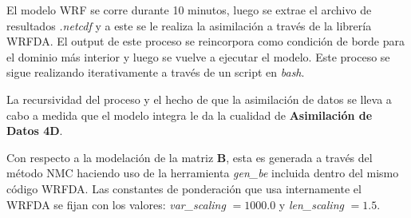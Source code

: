 El modelo WRF se corre durante 10 minutos, luego se extrae el archivo de resultados \emph{.netcdf} y a este se le realiza la asimilación a través de la librería WRFDA. El output de este proceso se reincorpora como condición de borde para el dominio más interior y luego se vuelve a ejecutar el modelo. Este proceso se sigue realizando iterativamente a través de un script en \emph{bash}.

La recursividad del proceso y el hecho de que la asimilación de datos se lleva a cabo a medida que el modelo integra le da la cualidad de \textbf{Asimilación de Datos 4D}.

Con respecto a la modelación de la matriz $\textbf{B}$, esta es generada a través del método NMC \citep{https://doi.org/10.5065/d68s4mvh} haciendo uso de la herramienta \emph{gen\_be} incluida dentro del mismo código WRFDA. Las constantes de ponderación que usa internamente el WRFDA se fijan con los valores: \emph{var\_scaling} $=1000.0$ y \emph{len\_scaling} $=1.5$.

